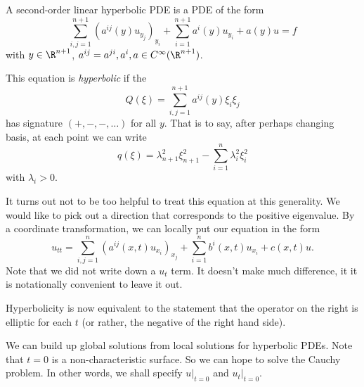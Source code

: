 \documentclass[a4paper]{article}
\begin{document}
\begin{defi}
  A second-order linear hyperbolic PDE is a PDE of the form
  \[
    \sum_{i, j = 1}^{n + 1} (a^{ij}(y) u_{y_j})_{y_i} + \sum_{i = 1}^{n + 1} a^i(y) u_{y_i} + a(y) u = f
  \]
  with $y \in \R^{n + 1}$, $a^{ij} = a^{ji}, a^i, a \in C^\infty(\R^{n + 1})$.

  This equation is \emph{hyperbolic} if the 
  \[
    Q(\xi) = \sum_{i, j = 1}^{n + 1} a^{ij}(y) \xi_i \xi_j
  \]
  has signature $(+, -, -, \ldots)$ for all $y$. That is to say, after perhaps changing basis, at each point we can write
  \[
    q(\xi) = \lambda_{n + 1}^2 \xi_{n + 1}^2 - \sum_{i = 1}^n \lambda_i^2 \xi_i^2
  \]
  with $\lambda_i > 0$.
\end{defi}

It turns out not to be too helpful to treat this equation at this generality. We would like to pick out a direction that corresponds to the positive eigenvalue. By a coordinate transformation, we can locally put our equation in the form
\[
  u_{tt} = \sum_{i, j = 1}^n (a^{ij}(x, t) u_{x_i})_{x_j} + \sum_{i = 1}^n b^i(x, t)u_{x_i} + c(x, t) u.
\]
Note that we did not write down a $u_t$ term. It doesn't make much difference, it it is notationally convenient to leave it out.

Hyperbolicity is now equivalent to the statement that the operator on the right is elliptic for each $t$ (or rather, the negative of the right hand side).

We can build up global solutions from local solutions for hyperbolic PDEs. Note that $t = 0$ is a non-characteristic surface. So we can hope to solve the Cauchy problem. In other words, we shall specify $u|_{t = 0}$ and $u_t|_{t = 0}$.
\end{document}
